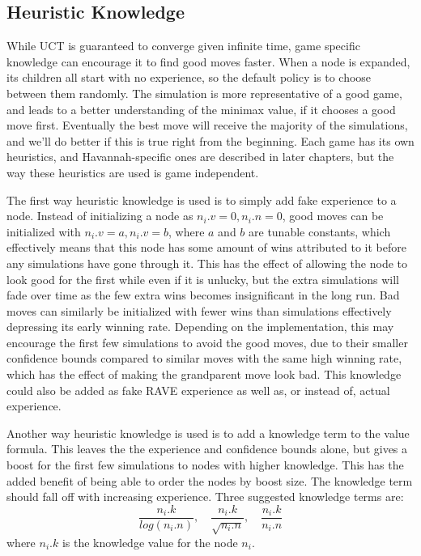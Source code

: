 \subsection{Heuristic Knowledge}\label{sec:heuristicknowledge}

While UCT is guaranteed to converge given infinite time, game specific knowledge can encourage it to find good moves faster. When a node is expanded, its children all start with no experience, so the default policy is to choose between them randomly. The simulation is more representative of a good game, and leads to a better understanding of the minimax value, if it chooses a good move first. Eventually the best move will receive the majority of the simulations, and we'll do better if this is true right from the beginning. Each game has its own heuristics, and Havannah-specific ones are described in later chapters, but the way these heuristics are used is game independent.

The first way heuristic knowledge is used is to simply add fake experience to a node. Instead of initializing a node as $n_i.v = 0, n_i.n = 0$, good moves can be initialized with $n_i.v = a, n_i.v = b$, where $a$ and $b$ are tunable constants, which effectively means that this node has some amount of wins attributed to it before any simulations have gone through it. This has the effect of allowing the node to look good for the first while even if it is unlucky, but the extra simulations will fade over time as the few extra wins becomes insignificant in the long run. Bad moves can similarly be initialized with fewer wins than simulations effectively depressing its early winning rate. Depending on the implementation, this may encourage the first few simulations to avoid the good moves, due to their smaller confidence bounds compared to similar moves with the same high winning rate, which has the effect of making the grandparent move look bad. This knowledge could also be added as fake RAVE experience as well as, or instead of, actual experience.

Another way heuristic knowledge is used is to add a knowledge term to the value formula. This leaves the the experience and confidence bounds alone, but gives a boost for the first few simulations to nodes with higher knowledge. This has the added benefit of being able to order the nodes by boost size. The knowledge term should fall off with increasing experience. Three suggested knowledge terms are: $$\frac{n_i.k}{log(n_i.n)}, \quad \frac{n_i.k}{\sqrt{n_i.n}}, \quad \frac{n_i.k}{n_i.n}$$ where $n_i.k$ is the knowledge value for the node $n_i$.


